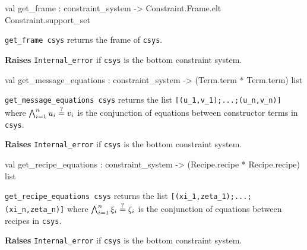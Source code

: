 \label{val:Constraint-underscoresystem.get-underscoreframe}\begin{ocamldoccode}
val get_frame :
  constraint_system ->
  Constraint.Frame.elt Constraint.support_set
\end{ocamldoccode}
\begin{ocamldocdescription}
{\tt{get\_frame csys}} returns the frame of {\tt{csys}}.

{\bf Raises} {\tt{Internal\_error}} if {\tt{csys}} is the bottom constraint system.


\end{ocamldocdescription}




\label{val:Constraint-underscoresystem.get-underscoremessage-underscoreequations}\begin{ocamldoccode}
val get_message_equations : constraint_system -> (Term.term * Term.term) list
\end{ocamldoccode}
\begin{ocamldocdescription}
{\tt{get\_message\_equations csys}} returns the list {\tt{[(u\_1,v\_1);...;(u\_n,v\_n)]}} where $\bigwedge_{i =1}^n u_i \stackrel{?}{=} v_i$  is the conjunction
    of equations between constructor terms in {\tt{csys}}.

{\bf Raises} {\tt{Internal\_error}} if {\tt{csys}} is the bottom constraint system.


\end{ocamldocdescription}




\label{val:Constraint-underscoresystem.get-underscorerecipe-underscoreequations}\begin{ocamldoccode}
val get_recipe_equations :
  constraint_system -> (Recipe.recipe * Recipe.recipe) list
\end{ocamldoccode}
\begin{ocamldocdescription}
{\tt{get\_recipe\_equations csys}} returns the list {\tt{[(xi\_1,zeta\_1);...;(xi\_n,zeta\_n)]}} where $\bigwedge_{i =1}^n \xi_i \stackrel{?}{=} \zeta_i$  is the conjunction
    of equations between recipes in {\tt{csys}}.

{\bf Raises} {\tt{Internal\_error}} if {\tt{csys}} is the bottom constraint system.


\end{ocamldocdescription}




